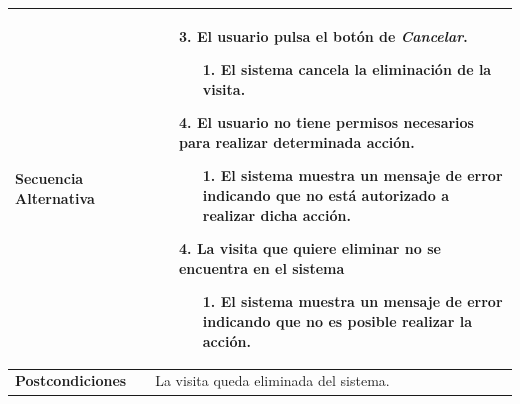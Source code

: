 \begin{longtable}{| p{4cm} | p{10cm} |}
\\
\hline
\textbf{Secuencia Alternativa} &\mbox{}\par\vspace{-\baselineskip}
\begin{enumerate}[leftmargin=0.9cm, topsep=0.1cm]
\item[3.] El usuario pulsa el botón de \textit{Cancelar}.
	\begin{itemize}
	\item[1.] El sistema cancela la eliminación de la visita.
	\end{itemize}
\item[4.] El usuario no tiene permisos necesarios para realizar determinada acción.
	\begin{itemize}
	\item[1.] El sistema muestra un mensaje de error indicando que no está autorizado a realizar dicha acción.
	\end{itemize}
\item[4.] La visita que quiere eliminar no se encuentra en el sistema
	\begin{itemize}
	\item[1.] El sistema muestra un mensaje de error indicando que no es posible realizar la acción.
	\end{itemize}
\end{enumerate}
\\

\hline
\textbf{Postcondiciones} & 
La visita queda eliminada del sistema.\\
\hline
\end{longtable}



\newpage

